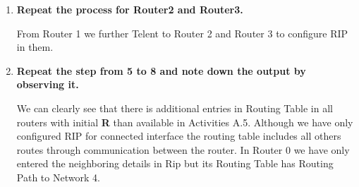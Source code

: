 \documentclass[a4paper,11pt]{article}
\begin{document}
\begin{enumerate}


    \item\textbf{Repeat the process for Router2 and Router3.}

          From Router 1 we further Telent to Router 2 and Router 3 to configure RIP in them.




    \item\textbf{Repeat the step from 5 to 8 and note down the output by observing it.}


          We can clearly see that there is additional entries in Routing Table in all routers with initial \textbf{R} than available in Activities A.5.  Although we have only configured RIP for connected interface the routing table includes all others routes through communication between the router. In Router 0 we have only entered the neighboring details in Rip but its Routing Table has Routing Path to Network 4.



          \begin{table}[H]
              \centering


\end{table}
\end{enumerate}
\end{document}
